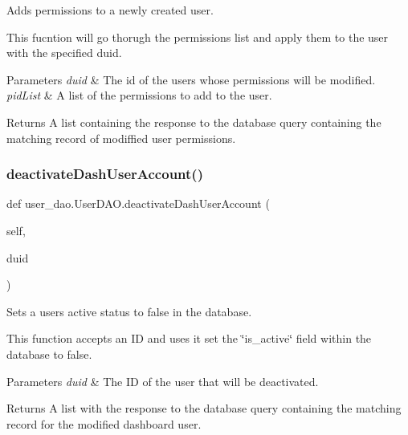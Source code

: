 Adds permissions to a newly created user. 

This fucntion will go thorugh the permissions list and apply them to the user with the specified duid.


\begin{DoxyParams}{Parameters}
{\em duid} & The id of the user\textquotesingle{}s whose permissions will be modified. \\
\hline
{\em pid\+List} & A list of the permissions to add to the user.\\
\hline
\end{DoxyParams}
\begin{DoxyReturn}{Returns}
A list containing the response to the database query containing the matching record of modiffied user permissions. 
\end{DoxyReturn}
\mbox{\label{classuser__dao_1_1_user_d_a_o_a55c3e96853d2538ff2608caab27c83f9}} 
\subsubsection{\texorpdfstring{deactivate\+Dash\+User\+Account()}{deactivateDashUserAccount()}}
{\footnotesize\ttfamily def user\+\_\+dao.\+User\+D\+A\+O.\+deactivate\+Dash\+User\+Account (\begin{DoxyParamCaption}\item[{}]{self,  }\item[{}]{duid }\end{DoxyParamCaption})}



Sets a user\textquotesingle{}s active status to false in the database. 

This function accepts an ID and uses it set the \char`\"{}is\+\_\+active\char`\"{} field within the database to false.


\begin{DoxyParams}{Parameters}
{\em duid} & The ID of the user that will be deactivated.\\
\hline
\end{DoxyParams}
\begin{DoxyReturn}{Returns}
A list with the response to the database query containing the matching record for the modified dashboard user. 
\end{DoxyReturn}
\mbox{\label{classuser__dao_1_1_user_d_a_o_a5842379bfb8cf679cb14fb8020943ebc}} 
